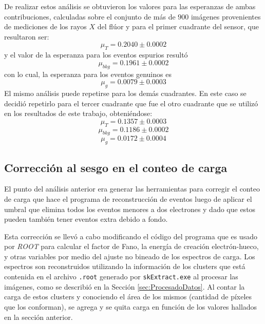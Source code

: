 De realizar estos análisis se obtuvieron los valores para las esperanzas de ambas contribuciones, calculadas sobre el conjunto de más de $900$ imágenes provenientes de mediciones de los rayos $X$ del flúor y para el primer cuadrante del sensor, que resultaron ser:
\begin{equation*}
    \mu_{T} = 0.2040 \pm 0.0002
\end{equation*}
y el valor de la esperanza para los eventos espurios resultó 
\begin{equation*}
    \mu_{bkg} = 0.1961 \pm 0.0002
\end{equation*}
con lo cual, la esperanza para los eventos genuinos es 
\begin{equation*}
    \mu_{g} = 0.0079 \pm 0.0003   
\end{equation*}
El mismo análisis puede repetirse para los demás cuadrantes. En este caso se decidió repetirlo para el tercer cuadrante que fue el otro cuadrante que se utilizó en los resultados de este trabajo, obteniéndose:
\begin{equation*}
    \mu_{T} = 0.1357 \pm 0.0003
\end{equation*}
\begin{equation*}
    \mu_{bkg} = 0.1186 \pm 0.0002
\end{equation*}
\begin{equation*}
    \mu_{g} = 0.0172 \pm 0.0004   
\end{equation*}

\subsection{Corrección al sesgo en el conteo de carga}
\noindent El punto del análisis anterior era generar las herramientas para corregir el conteo de carga que hace el programa de reconstrucción de eventos luego de aplicar el umbral que elimina todos los eventos menores a dos electrones y dado que estos pueden también tener eventos extra debido a fondo.

Esta corrección se llevó a cabo modificando el código del programa que es usado por \textit{ROOT} para calcular el factor de Fano, la energía de creación electrón-hueco, y otras variables por medio del ajuste no bineado de los espectros de carga. Los espectros son reconstruidos utilizando la información de los clusters que está contenida en el archivo \verb|.root| generado por \verb|skExtract.exe| al procesar las imágenes, como se describió en la Sección \ref{sec:ProcesadoDatos}. Al contar la carga de estos clusters y conociendo el área de los mismos (cantidad de píxeles que los conforman), se agrega y se quita carga en función de los valores hallados en la sección anterior.

